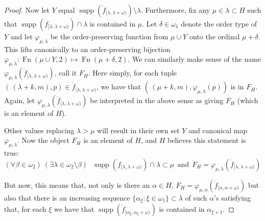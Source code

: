 \documentclass{amsart}
\theoremstyle{plain}
\theoremstyle{definition}
\theoremstyle{remark}
\theoremstyle{plain}
\theoremstyle{definition}
\theoremstyle{remark}
\begin{document}
\begin{proof}
             Now let $Y$ equal $\operatorname{supp}(\dot
             f_{[\lambda,\lambda+\omega)})\setminus \lambda$. Furthermore,
             fix any $\mu\in \lambda\subset H$ such that
               $\operatorname{supp}(\dot
             f_{[\lambda,\lambda+\omega)})\cap \lambda$ is contained in $\mu$.
             Let $\delta\in \omega_1$ denote the order type of
             $Y$ and let  $\varphi_{\mu,\lambda}$ be the order-preserving function
             from  $\mu\cup Y$ onto  the ordinal $\mu+\delta$.  This lifts
             canonically to
            an order-preserving bijection $\varphi_{\mu,\lambda}:
            \operatorname{Fn}(\mu\cup Y,2) \mapsto
            \operatorname{Fn}(\mu+\delta,2)$.
            We can similarly make sense of the name
             $\varphi_{\mu,\lambda}(\dot f_{[\lambda,\lambda+\omega)})$, call it $F_H$.
            Here simply, for each tuple $(\,(\lambda+k,m), p)\in \dot
            f_{[\lambda,\lambda+\omega)}$,
             we have that $(\,(\mu+k,m),\varphi_{\mu,\lambda}(p))$ is in $F_H$.
            Again, let $\varphi_{\mu,\lambda}(\dot f_{[\lambda,\lambda+\omega)})$
            be interpreted in the above sense as giving $F_H$ (which is an element
            of $H$).


             Other values
            replacing $\lambda>\mu$ will result in their own set $Y$
            and canonical map $\varphi_{\mu,\lambda}$.
            Now the object $F_H$ is an
            element of $H$, and $H$ believes this statement is true:
            $$
            (\forall \beta\in\omega_2)~ (\exists \lambda\in \omega_2\setminus \beta)~~~
            \operatorname{supp}(\dot f_{[\lambda,\lambda+\omega)})
            \cap \lambda\subset \mu \ \ \mbox{and}\ \
            F_H = \varphi_{\mu,\lambda}(\dot f_{[\lambda,\lambda+\omega)})$$


            But now, this  means that,
            not only is there  an $\alpha\in H$,
            $ F_H = \varphi_{\mu,\alpha}(\dot f_{[\alpha,\alpha+\omega)})$
            but also that there is an increasing sequence
             $\{\alpha_\xi : \xi  \in \omega_1\}\subset \lambda$ of
             such $\alpha$'s satisfying that, for each $\xi$
            we have that $\operatorname{supp}(\dot
            f_{[\alpha_\xi,\alpha_\xi+\omega)})$ is contained in $\alpha_{\xi+1}$.


\end{proof}
\end{document}
